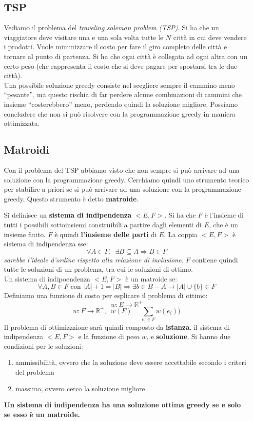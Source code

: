 \documentclass[a4paper,12pt, oneside]{book}
\begin{document}
\subsection{TSP}
Vediamo il problema del \textit{traveling saleman problem (TSP)}. Si
ha che un viaggiatore deve visitare una e una sola volta tutte le $N$
città in cui deve vendere i prodotti. Vuole minimizzare il costo per
fare il giro completo delle città e tornare al punto di partenza. Si
ha che ogni città è collegata ad ogni altra con un certo peso (che
rappresenta il costo che si deve pagare per spostarsi tra le due
città).\\
Una possibile soluzione greedy consiste nel scegliere sempre il
cammino meno ``pesante'', ma questo rischia di far perdere alcune
combinazioni di cammini che insieme ``costerebbero'' meno, perdendo
quindi la soluzione migliore. Possiamo concludere che non si può
risolvere con la programmazione greedy in maniera ottimizzata.
\subsection{Matroidi}
Con il problema del TSP abbiamo visto che non sempre si può arrivare
ad una soluzione con la programmazione greedy. Cerchiamo quindi uno
strumento teorico per stabilire a priori se si può arrivare ad una
soluzione con la programmazione greedy. Questo strumento è detto
\textbf{matroide}.
\begin{definizione}
  Si definisce un \textbf{sistema di indipendenza} $<E,F>$. Si ha che
  $F$ è l'insieme di tutti i possibili sottoinsiemi construibili a
  partire dagli elementi di $E$, che è un insieme finito. $F$ è quindi
  \textbf{l'insieme delle parti} di $E$. La coppia $<E,F>$ è sistema
  di indipendenza sse:
  \[\forall A\in F,\,\,\, \exists B\subseteq A\Rightarrow B\in F\]
  \textit{sarebbe l'ideale d’ordine rispetto alla relazione di
    inclusione}. $F$ contiene quindi tutte le soluzioni di un
  problema, tra cui le soluzioni di ottimo.\\
  Un sistema di indipoendenza $<E,F>$ è un matroide se:
  \[\forall A,B\in F\mbox{ con }|A|+1=|B|\Longrightarrow\exists b\in
    B-A\to |A|\cup \{b\}\in F\]
  Definiamo una funzione di costo per esplicare il problema di
  ottimo:
  \[w:E\to \mathbb{R}^+\]
  \[w:F\to \mathbb{R}^+,\,\,\,w(F)=\sum_{e_i\in F}w(e_i))\]
  Il problema di ottimizzzione sarà quindi composto da
  \textbf{istanza}, il sistema di indipendenza $<E,F>$ e la funzione
  di peso $w$, e \textbf{soluzione}. Si hanno due condizioni per le
  soluzioni:
  \begin{enumerate}
    \item ammissibilità, ovvero che la soluzione deve essere
    accettabile secondo i criteri del problema
    \item massimo, ovvero cerco la soluzione migliore
  \end{enumerate}
  \textbf{Un sistema di indipendenza
    ha una soluzione ottima greedy se e solo se esso è un matroide.}
\end{definizione}
\end{document}
